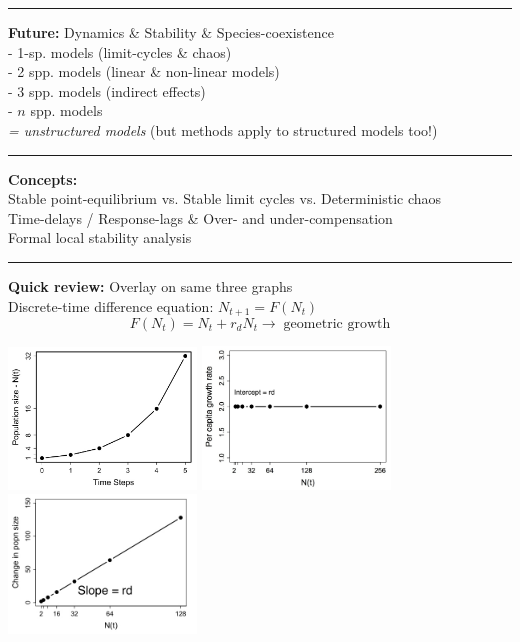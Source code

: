\documentclass{article}
\newcommand{\note}[1]{\colorbox{gray!30}{#1}}
\newcommand{\ind}{\-\hspace{1cm}}
\begin{document}
\noindent{}
\rule[0.5ex]{\linewidth}{1pt}
\textbf{Future:}
Dynamics \& Stability \& Species-coexistence\\
\ind \ind - 1-sp. models (limit-cycles \& chaos)\\
\ind \ind - 2 spp. models (linear \& non-linear models)\\
\ind \ind - 3 spp. models (indirect effects)\\
\ind \ind - $n$ spp. models\\
\ind \emph{ = unstructured models} (but methods apply to structured models too!)

\rule[0.5ex]{\linewidth}{1pt}

\textbf{Concepts:}\\
\ind Stable point-equilibrium vs. Stable limit cycles vs. Deterministic chaos\\
\ind Time-delays / Response-lags \& Over- and under-compensation\\
\ind Formal local stability analysis

\rule[0.5ex]{\linewidth}{1pt}

\textbf{Quick review:} \note{Overlay on same three graphs}\\
Discrete-time difference equation: $N_{t+1}=F(N_t)$\\
\begin{equation*}
	F(N_t)=N_t + r_d N_t \to \; \text{geometric growth}
\end{equation*}

\begin{center}
\includegraphics[width=5cm]{figs/a.png}
\includegraphics[width=5cm]{figs/b.jpg}
\includegraphics[width=5cm]{figs/c.jpg}
\end{center}
\end{document}
